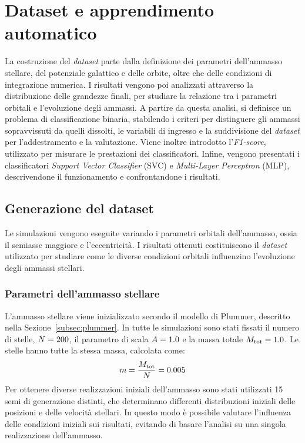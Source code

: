 \chapter{Dataset e apprendimento automatico}
La costruzione del \emph{dataset} parte dalla definizione dei parametri dell'ammasso stellare, del potenziale galattico e delle orbite, oltre che delle condizioni di integrazione numerica. I risultati vengono poi analizzati attraverso la distribuzione delle grandezze finali, per studiare la relazione tra i parametri orbitali e l'evoluzione degli ammassi.
A partire da questa analisi, si definisce un problema di classificazione binaria, stabilendo i criteri per distinguere gli ammassi sopravvissuti da quelli dissolti, le variabili di ingresso e la suddivisione del \emph{dataset} per l'addestramento e la valutazione. Viene inoltre introdotto l'\emph{F1-score}, utilizzato per misurare le prestazioni dei classificatori. Infine, vengono presentati i classificatori \emph{Support Vector Classifier} (SVC) e \emph{Multi-Layer Perceptron} (MLP), descrivendone il funzionamento e confrontandone i risultati.
\section{Generazione del dataset}
\label{sec:costruzione-dataset}
Le simulazioni vengono eseguite variando i parametri orbitali dell'ammasso, ossia il semiasse maggiore e l'eccentricità. I risultati ottenuti costituiscono il \emph{dataset} utilizzato per studiare come le diverse condizioni orbitali influenzino l'evoluzione degli ammassi stellari.
\subsection{Parametri dell'ammasso stellare}
\label{subsec:condizioni-iniziali}
L'ammasso stellare viene inizializzato secondo il modello di Plummer, descritto nella Sezione~\ref{subsec:plummer}. In tutte le simulazioni sono stati fissati il numero di stelle, $N=200$, il parametro di scala $A=1.0$ e la massa totale $M_{\mathrm{tot}}=1.0$.
Le stelle hanno tutte la stessa massa, calcolata come:
\begin{equation}
	m=\frac{M_{\mathrm{tot}}}{N}=0.005
	\label{eq:massa-singola-stella}
\end{equation}
Per ottenere diverse realizzazioni iniziali dell'ammasso sono stati utilizzati 15 semi di generazione distinti, che determinano differenti distribuzioni iniziali delle posizioni e delle velocità stellari. In questo modo è possibile valutare l'influenza delle condizioni iniziali sui risultati, evitando di basare l'analisi su una singola realizzazione dell'ammasso.
